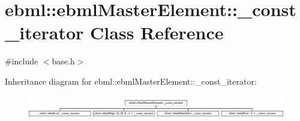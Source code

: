 \hypertarget{classebml_1_1ebmlMasterElement_1_1__const__iterator}{}\section{ebml\+:\+:ebml\+Master\+Element\+:\+:\+\_\+const\+\_\+iterator Class Reference}
\label{classebml_1_1ebmlMasterElement_1_1__const__iterator}


{\ttfamily \#include $<$base.\+h$>$}

Inheritance diagram for ebml\+:\+:ebml\+Master\+Element\+:\+:\+\_\+const\+\_\+iterator\+:\begin{figure}[H]
\begin{center}
\leavevmode
\includegraphics[height=1.007194cm]{classebml_1_1ebmlMasterElement_1_1__const__iterator}
\end{center}
\end{figure}
